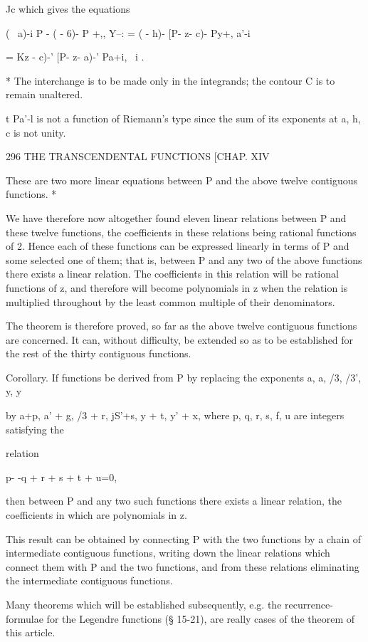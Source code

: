 Jc which gives the equations

( \ a)-i P - ( - 6)- P +,, Y--: = ( - h)- [P- z- c)- Py+, a'-i

= Kz - c)-' [P- z- a)-' Pa+i, \ i .

* The interchange is to be made only in the integrands; the contour C
is to remain unaltered.

t Pa'-l is not a function of Riemann's type since the sum of its
exponents at a, h, c is not unity.

296 THE TRANSCENDENTAL FUNCTIONS [CHAP. XIV

These are two more linear equations between P and the above twelve
contiguous functions. *

We have therefore now altogether found eleven linear relations between
P and these twelve functions, the coefficients in these relations
being rational functions of 2. Hence each of these functions can be
expressed linearly in terms of P and some selected one of them; that
is, between P and any two of the above functions there exists a linear
relation. The coefficients in this relation will be rational functions
of z, and therefore will become polynomials in z when the relation is
multiplied throughout by the least common multiple of their
denominators.

The theorem is therefore proved, so far as the above twelve contiguous
functions are concerned. It can, without difficulty, be extended so as
to be established for the rest of the thirty contiguous functions.

Corollary. If functions be derived from P by replacing the exponents
a, a, /3, /3', y, y

by a+p, a' + g, /3 + r, jS'+s, y + t, y' + x, where p, q, r, s, f, u
are integers satisfying the

relation

p- -q + r + s + t + u=0,

then between P and any two such functions there exists a linear
relation, the coefficients in which are polynomials in z.

This result can be obtained by connecting P with the two functions by
a chain of intermediate contiguous functions, writing down the linear
relations which connect them with P and the two functions, and from
these relations eliminating the intermediate contiguous functions.

Many theorems which will be established subsequently, e.g. the
recurrence-formulae for the Legendre functions (§ 15-21), are really
cases of the theorem of this article.

